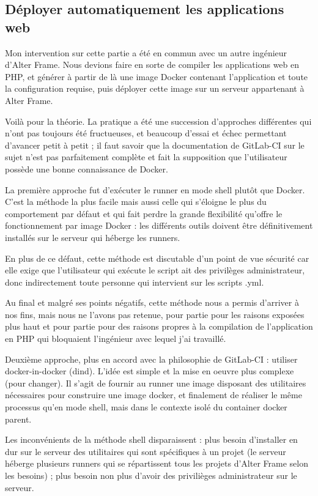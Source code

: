 \subsection{Déployer automatiquement les applications web}
Mon intervention sur cette partie a été en commun avec un autre ingénieur d'Alter Frame. Nous devions faire en sorte de compiler les applications web en PHP, et générer à partir de là une image Docker contenant l'application et toute la configuration requise, puis  déployer cette image sur un serveur appartenant à Alter Frame.

Voilà pour la théorie. La pratique a été une succession d'approches différentes qui n'ont pas toujours été fructueuses, et beaucoup d'essai et échec permettant d'avancer petit à petit ; il faut savoir que la documentation de GitLab-CI sur le sujet\cite{gitlab_docker_build} n'est pas parfaitement complète et fait la supposition que l'utilisateur possède une bonne connaissance de Docker.

La première approche fut d'exécuter le runner en mode shell plutôt que Docker. C'est la méthode la plus facile mais aussi celle qui s'éloigne le plus du comportement par défaut et qui fait perdre la grande flexibilité qu'offre le fonctionnement par image Docker : les différents outils doivent être définitivement installés sur le serveur qui héberge les runners.

En plus de ce défaut, cette méthode est discutable d'un point de vue sécurité car elle exige que l'utilisateur qui exécute le script ait des privilèges administrateur, donc indirectement toute personne qui intervient sur les scripts .yml\cite{docker_sec}.

Au final et malgré ses points négatifs, cette méthode nous a permis d'arriver à nos fins, mais nous ne l'avons pas retenue, pour partie pour les raisons exposées plus haut et pour partie pour des raisons propres à la compilation de l'application en PHP qui bloquaient l'ingénieur avec lequel j'ai travaillé.

Deuxième approche, plus en accord avec la philosophie de GitLab-CI : utiliser docker-in-docker (dind). L'idée est simple et la mise en oeuvre plus complexe (pour changer). Il s'agit de fournir au runner une image disposant des utilitaires nécessaires pour construire une image docker, et finalement de réaliser le même processus qu'en mode shell, mais dans le contexte isolé du container docker parent.

Les inconvénients de la méthode shell disparaissent : plus besoin d'installer en dur sur le serveur des utilitaires qui sont spécifiques à un projet (le serveur héberge plusieurs runners qui se répartissent tous les projets d'Alter Frame selon les besoins) ; plus besoin non plus d'avoir des privilièges administrateur sur le serveur.

